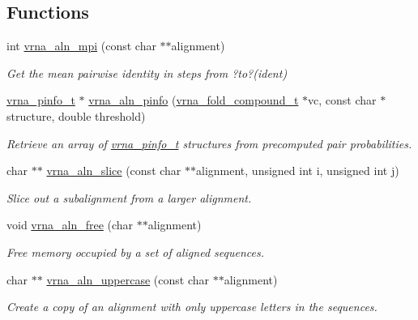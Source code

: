 \subsection*{Functions}
\begin{DoxyCompactItemize}
\item 
int \hyperlink{group__aln__utils_gade5a1f2d16e7fd9a57b37d8514f08e8e}{vrna\+\_\+aln\+\_\+mpi} (const char $\ast$$\ast$alignment)
\begin{DoxyCompactList}\small\item\em Get the mean pairwise identity in steps from ?to?(ident) \end{DoxyCompactList}\item 
\hyperlink{group__aln__utils_ga6660dfca23debee7306e0cd53341263f}{vrna\+\_\+pinfo\+\_\+t} $\ast$ \hyperlink{group__aln__utils_gaf6421a1318586c59fea6a127ed9f65f3}{vrna\+\_\+aln\+\_\+pinfo} (\hyperlink{group__fold__compound_ga1b0cef17fd40466cef5968eaeeff6166}{vrna\+\_\+fold\+\_\+compound\+\_\+t} $\ast$vc, const char $\ast$structure, double threshold)
\begin{DoxyCompactList}\small\item\em Retrieve an array of \hyperlink{group__aln__utils_ga6660dfca23debee7306e0cd53341263f}{vrna\+\_\+pinfo\+\_\+t} structures from precomputed pair probabilities. \end{DoxyCompactList}\item 
char $\ast$$\ast$ \hyperlink{group__aln__utils_gac801b0a72eac4ab9d5b2ef7533db9193}{vrna\+\_\+aln\+\_\+slice} (const char $\ast$$\ast$alignment, unsigned int i, unsigned int j)
\begin{DoxyCompactList}\small\item\em Slice out a subalignment from a larger alignment. \end{DoxyCompactList}\item 
void \hyperlink{group__aln__utils_gac00dc80b8a324f151f92f11ab6850ecf}{vrna\+\_\+aln\+\_\+free} (char $\ast$$\ast$alignment)
\begin{DoxyCompactList}\small\item\em Free memory occupied by a set of aligned sequences. \end{DoxyCompactList}\item 
char $\ast$$\ast$ \hyperlink{group__aln__utils_ga3a0476a71c4bae3d302790de58055704}{vrna\+\_\+aln\+\_\+uppercase} (const char $\ast$$\ast$alignment)
\begin{DoxyCompactList}\small\item\em Create a copy of an alignment with only uppercase letters in the sequences. \end{DoxyCompactList}\item 

\end{DoxyCompactItemize}
